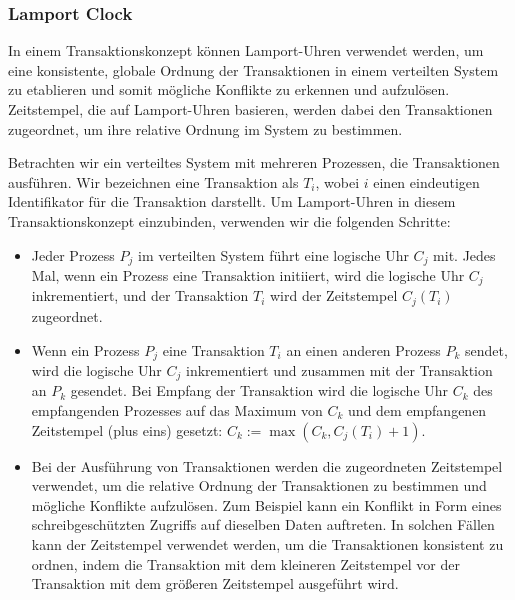 \subsubsection{Lamport Clock}
In einem Transaktionskonzept können Lamport-Uhren verwendet werden, um eine konsistente, globale Ordnung der Transaktionen in einem verteilten System zu etablieren und somit mögliche Konflikte zu erkennen und aufzulösen. Zeitstempel, die auf Lamport-Uhren basieren, werden dabei den Transaktionen zugeordnet, um ihre relative Ordnung im System zu bestimmen.

Betrachten wir ein verteiltes System mit mehreren Prozessen, die Transaktionen ausführen. Wir bezeichnen eine Transaktion als $T_i$, wobei $i$ einen eindeutigen Identifikator für die Transaktion darstellt. Um Lamport-Uhren in diesem Transaktionskonzept einzubinden, verwenden wir die folgenden Schritte:
\begin{itemize}
\item Jeder Prozess $P_j$ im verteilten System führt eine logische Uhr $C_j$ mit. Jedes Mal, wenn ein Prozess eine Transaktion initiiert, wird die logische Uhr $C_j$ inkrementiert, und der Transaktion $T_i$ wird der Zeitstempel $C_j(T_i)$ zugeordnet.

\item Wenn ein Prozess $P_j$ eine Transaktion $T_i$ an einen anderen Prozess $P_k$ sendet, wird die logische Uhr $C_j$ inkrementiert und zusammen mit der Transaktion an $P_k$ gesendet. Bei Empfang der Transaktion wird die logische Uhr $C_k$ des empfangenden Prozesses auf das Maximum von $C_k$ und dem empfangenen Zeitstempel (plus eins) gesetzt: $C_k := \max(C_k, C_j(T_i) + 1)$.

\item Bei der Ausführung von Transaktionen werden die zugeordneten Zeitstempel verwendet, um die relative Ordnung der Transaktionen zu bestimmen und mögliche Konflikte aufzulösen. Zum Beispiel kann ein Konflikt in Form eines schreibgeschützten Zugriffs auf dieselben Daten auftreten. In solchen Fällen kann der Zeitstempel verwendet werden, um die Transaktionen konsistent zu ordnen, indem die Transaktion mit dem kleineren Zeitstempel vor der Transaktion mit dem größeren Zeitstempel ausgeführt wird.
\end{itemize}


